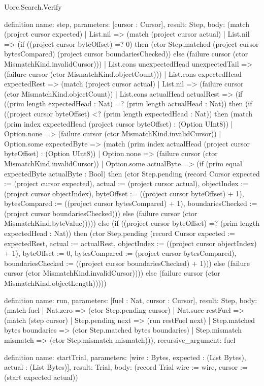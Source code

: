 \begin{lexlean}{Uorc.Search.Verify}
\begin{semanticmodule}
definition{
  name: step,
  parameters: [cursor : Cursor],
  result: Step,
  body: (match (project cursor expected)
    | List.nil => (match (project cursor actual)
      | List.nil => (if ((project cursor byteOffset) =? 0) then (ctor Step.matched (project cursor bytesCompared) (project cursor boundariesChecked)) else (failure cursor (ctor MismatchKind.invalidCursor)))
      | List.cons unexpectedHead unexpectedTail => (failure cursor (ctor MismatchKind.objectCount)))
    | List.cons expectedHead expectedRest => (match (project cursor actual)
      | List.nil => (failure cursor (ctor MismatchKind.objectCount))
      | List.cons actualHead actualRest => (if ((prim length expectedHead : Nat) =? (prim length actualHead : Nat)) then (if ((project cursor byteOffset) <? (prim length expectedHead : Nat)) then (match (prim index expectedHead (project cursor byteOffset) : (Option UInt8))
        | Option.none => (failure cursor (ctor MismatchKind.invalidCursor))
        | Option.some expectedByte => (match (prim index actualHead (project cursor byteOffset) : (Option UInt8))
          | Option.none => (failure cursor (ctor MismatchKind.invalidCursor))
          | Option.some actualByte => (if (prim equal expectedByte actualByte : Bool) then (ctor Step.pending (record Cursor {expected := (project cursor expected), actual := (project cursor actual), objectIndex := (project cursor objectIndex), byteOffset := ((project cursor byteOffset) + 1), bytesCompared := ((project cursor bytesCompared) + 1), boundariesChecked := (project cursor boundariesChecked)})) else (failure cursor (ctor MismatchKind.byteValue))))) else (if ((project cursor byteOffset) =? (prim length expectedHead : Nat)) then (ctor Step.pending (record Cursor {expected := expectedRest, actual := actualRest, objectIndex := ((project cursor objectIndex) + 1), byteOffset := 0, bytesCompared := (project cursor bytesCompared), boundariesChecked := ((project cursor boundariesChecked) + 1)})) else (failure cursor (ctor MismatchKind.invalidCursor)))) else (failure cursor (ctor MismatchKind.objectLength)))))
}

definition{
  name: run,
  parameters: [fuel : Nat, cursor : Cursor],
  result: Step,
  body: (match fuel
    | Nat.zero => (ctor Step.pending cursor)
    | Nat.succ restFuel => (match (step cursor)
      | Step.pending next => (run restFuel next)
      | Step.matched bytes boundaries => (ctor Step.matched bytes boundaries)
      | Step.mismatch mismatch => (ctor Step.mismatch mismatch))),
  recursive_argument: fuel
}

definition{
  name: startTrial,
  parameters: [wire : Bytes, expected : (List Bytes), actual : (List Bytes)],
  result: Trial,
  body: (record Trial {wire := wire, cursor := (start expected actual)})
}


\end{semanticmodule}
\end{lexlean}
